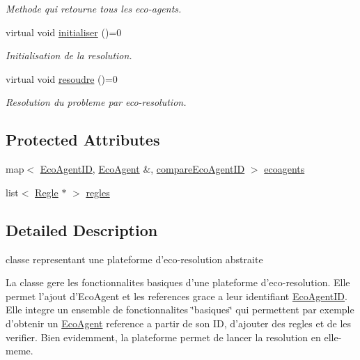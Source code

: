 \begin{CompactItemize}
\begin{CompactList}\small\item\em Methode qui retourne tous les eco-agents. \item\end{CompactList}\item 
virtual void \hyperlink{classPlateformeEcoResolution_57d87139f09ca51cd6a4fa7cd2e83351}{initialiser} ()=0
\begin{CompactList}\small\item\em Initialisation de la resolution. \item\end{CompactList}\item 
virtual void \hyperlink{classPlateformeEcoResolution_17f587580cd8aee537551bc0ddd82bef}{resoudre} ()=0
\begin{CompactList}\small\item\em Resolution du probleme par eco-resolution. \item\end{CompactList}\end{CompactItemize}
\subsection*{Protected Attributes}
\begin{CompactItemize}
\item 
map$<$ \hyperlink{classEcoAgentID}{EcoAgentID}, \hyperlink{classEcoAgent}{EcoAgent} \&, \hyperlink{structcompareEcoAgentID}{compareEcoAgentID} $>$ \hyperlink{classPlateformeEcoResolution_02de97d0d9dac3719ceaadfb255492a3}{ecoagents}
\item 
list$<$ \hyperlink{classRegle}{Regle} $\ast$ $>$ \hyperlink{classPlateformeEcoResolution_4f7dc37edf042a189073f15771604e35}{regles}
\end{CompactItemize}


\subsection{Detailed Description}
classe representant une plateforme d'eco-resolution abstraite 

La classe gere les fonctionnalites basiques d'une plateforme d'eco-resolution. Elle permet l'ajout d'EcoAgent et les references grace a leur identifiant \hyperlink{classEcoAgentID}{EcoAgentID}. Elle integre un ensemble de fonctionnalites \char`\"{}basiques\char`\"{} qui permettent par exemple d'obtenir un \hyperlink{classEcoAgent}{EcoAgent} reference a partir de son ID, d'ajouter des regles et de les verifier. Bien evidemment, la plateforme permet de lancer la resolution en elle-meme. 

